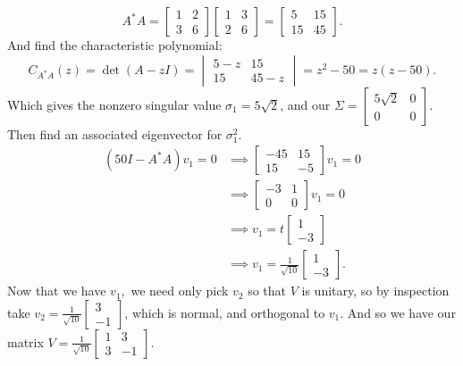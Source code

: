 \documentclass{article}
\begin{document}
\begin{enumerate}
\begin{enumerate}[label= (\alph*)]
\[
    A^* A=\begin{bmatrix} 1&2\\3&6 \end{bmatrix} \begin{bmatrix} 1&3\\2&6 \end{bmatrix} 
    =\begin{bmatrix} 5&15\\15&45 \end{bmatrix} 
.\] 
And find the characteristic polynomial:
\[
    C_{A^* A}(z)=\det(A-zI)=\begin{vmatrix} 5-z&15\\15&45-z \end{vmatrix}= z^2-50=z(z-50)
.\] 
    Which gives the nonzero singular value $\sigma_1=5\sqrt{2} $, and our $\Sigma=\begin{bmatrix} 5\sqrt{2} &0\\0&0 \end{bmatrix} $. Then find an associated eigenvector for $\sigma_1^2$.
    \begin{align*}
        (50I-A^* A)v_1=0&\implies \begin{bmatrix} -45&15\\15&-5 \end{bmatrix}v_1=0 \\
                        &\implies \begin{bmatrix} -3&1\\0&0\end{bmatrix}v_1=0 \\
                        &\implies v_1=t\begin{bmatrix} 1\\-3 \end{bmatrix} \\
                        &\implies v_1=\frac{1}{\sqrt{10} }\begin{bmatrix} 1\\-3 \end{bmatrix} 
    .\end{align*}
    Now that we have $v_1,$ we need only pick $v_2$ so that $V$ is unitary, so by inspection take $v_2=\frac{1}{\sqrt{10} }\begin{bmatrix} 3\\-1 \end{bmatrix} $, which is normal, and orthogonal to $v_1$. And so we have our matrix $V=\frac{1}{\sqrt{10} }\begin{bmatrix} 1&3\\3&-1 \end{bmatrix} $.


\end{enumerate}
\end{enumerate}
\end{document}
